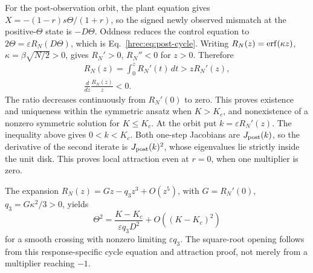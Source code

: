For the post-observation orbit, the plant equation gives
\(X=-(1-r)s\Theta/(1+r)\), so the signed newly observed mismatch at the positive-\(\Theta\) state is \(-D\Theta\). Oddness reduces the control equation to
\(2\Theta=\varepsilon R_N(D\Theta)\), which is Eq.~\eqref{hrec:eq:post-cycle}.
Writing \(R_N(z)=\operatorname{erf}(\kappa z)\), \(\kappa=\beta\sqrt{N/2}>0\), gives \(R_N'>0\), \(R_N''<0\) for \(z>0\). Therefore
\[
 \begin{gathered}
 R_N(z)=\int_0^zR_N'(t)\,dt>zR_N'(z),\\
 \frac{d}{dz}\frac{R_N(z)}z<0.
 \end{gathered}
\]
The ratio decreases continuously from \(R_N'(0)\) to zero. This proves existence and uniqueness within the symmetric ansatz when \(K>K_c\), and nonexistence of a nonzero symmetric solution for \(K\le K_c\). At the orbit put \(k=\varepsilon R_N'(z)\). The inequality above gives \(0<k<K_c\). Both one-step Jacobians are \(J_{\rm post}(k)\), so the derivative of the second iterate is \(J_{\rm post}(k)^2\), whose eigenvalues lie strictly inside the unit disk. This proves local attraction even at \(r=0\), when one multiplier is zero.

The expansion \(R_N(z)=Gz-q_3z^3+O(z^5)\), with \(G=R_N'(0)\), \(q_3=G\kappa^2/3>0\), yields
\[
 \Theta^2=\frac{K-K_c}{\varepsilon q_3D^2}
           +O((K-K_c)^2)
\]
for a smooth crossing with nonzero limiting \(\varepsilon q_3\). The square-root opening follows from this response-specific cycle equation and attraction proof, not merely from a multiplier reaching \(-1\).

